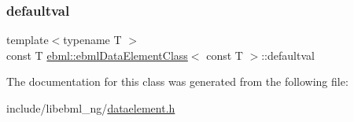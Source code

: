 \mbox{\label{classebml_1_1ebmlDataElementClass_3_01const_01T_01_4_aea8b5f04ffa6327c211e20171d75fdcd}} 
\subsubsection{\texorpdfstring{defaultval}{defaultval}}
{\footnotesize\ttfamily template$<$typename T $>$ \\
const T \mbox{\hyperlink{classebml_1_1ebmlDataElementClass}{ebml\+::ebml\+Data\+Element\+Class}}$<$ const T $>$\+::defaultval}



The documentation for this class was generated from the following file\+:\begin{DoxyCompactItemize}
\item 
include/libebml\+\_\+ng/\mbox{\hyperlink{dataelement_8h}{dataelement.\+h}}\end{DoxyCompactItemize}
